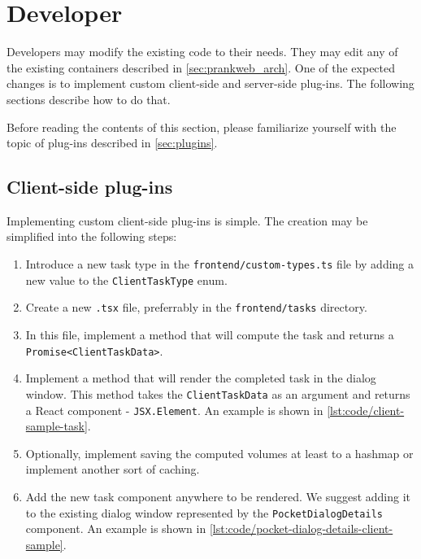 \section{Developer}
\label{sec:developer}

Developers may modify the existing code to their needs. They may edit any of the existing containers described in \cref{sec:prankweb_arch}. One of the expected changes is to implement custom client-side and server-side plug-ins. The following sections describe how to do that.

Before reading the contents of this section, please familiarize yourself with the topic of plug-ins described in \cref{sec:plugins}.

\subsection{Client-side plug-ins}
\label{subsec:dev_client_side}

Implementing custom client-side plug-ins is simple. The creation may be simplified into the following steps:

\begin{enumerate}
    \item Introduce a new task type in the \texttt{frontend/custom-types.ts} file by adding a new value to the \texttt{ClientTaskType} enum.
    \item Create a new \texttt{.tsx} file, preferrably in the \texttt{frontend/tasks} directory.
    \item In this file, implement a method that will compute the task and returns a \texttt{Promise<ClientTaskData>}.
    \item Implement a method that will render the completed task in the dialog window. This method takes the \texttt{ClientTaskData} as an argument and returns a React component - \texttt{JSX.Element}. An example is shown in \cref{lst:code/client-sample-task}.
    \item Optionally, implement saving the computed volumes at least to a hashmap or implement another sort of caching.
    \item Add the new task component anywhere to be rendered. We suggest adding it to the existing dialog window represented by the \texttt{PocketDialogDetails} component. An example is shown in \cref{lst:code/pocket-dialog-details-client-sample}.
\end{enumerate}



